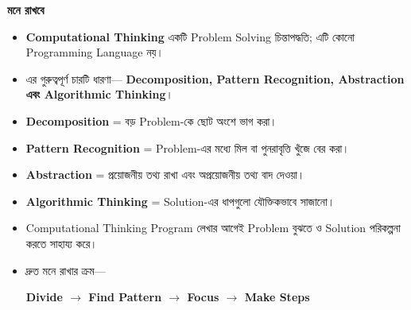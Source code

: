 \begin{rememberbox}

\textbf{\color{deepOrange}মনে রাখবে}

\begin{itemize}

\item \textbf{Computational Thinking} একটি Problem Solving
চিন্তাপদ্ধতি; এটি কোনো Programming Language নয়।

\item এর গুরুত্বপূর্ণ চারটি ধারণা—
\textbf{Decomposition, Pattern Recognition, Abstraction এবং
Algorithmic Thinking}।

\item \textbf{Decomposition} =
বড় Problem-কে ছোট অংশে ভাগ করা।

\item \textbf{Pattern Recognition} =
Problem-এর মধ্যে মিল বা পুনরাবৃত্তি খুঁজে বের করা।

\item \textbf{Abstraction} =
প্রয়োজনীয় তথ্য রাখা এবং অপ্রয়োজনীয় তথ্য বাদ দেওয়া।

\item \textbf{Algorithmic Thinking} =
Solution-এর ধাপগুলো যৌক্তিকভাবে সাজানো।

\item Computational Thinking Program লেখার আগেই
Problem বুঝতে ও Solution পরিকল্পনা করতে সাহায্য করে।

\item দ্রুত মনে রাখার ক্রম—

\begin{center}

\textbf{
Divide
\(\longrightarrow\)
Find Pattern
\(\longrightarrow\)
Focus
\(\longrightarrow\)
Make Steps
}

\end{center}

\end{itemize}

\end{rememberbox}

\small

